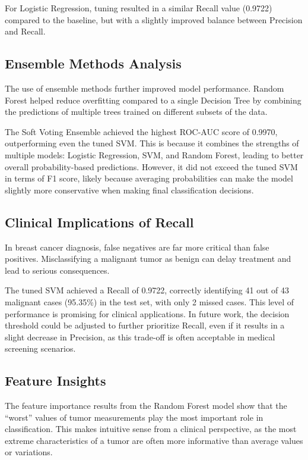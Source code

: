 \documentclass[conference]{IEEEtran}
\begin{document}
For Logistic Regression, tuning resulted in a similar Recall value (0.9722) compared to the baseline, but with a slightly improved balance between Precision and Recall.

\subsection{Ensemble Methods Analysis}

The use of ensemble methods further improved model performance. Random Forest helped reduce overfitting compared to a single Decision Tree by combining the predictions of multiple trees trained on different subsets of the data.

The Soft Voting Ensemble achieved the highest ROC-AUC score of 0.9970, outperforming even the tuned SVM. This is because it combines the strengths of multiple models: Logistic Regression, SVM, and Random Forest, leading to better overall probability-based predictions. However, it did not exceed the tuned SVM in terms of F1 score, likely because averaging probabilities can make the model slightly more conservative when making final classification decisions.

\subsection{Clinical Implications of Recall}

In breast cancer diagnosis, false negatives are far more critical than false positives. Misclassifying a malignant tumor as benign can delay treatment and lead to serious consequences.

The tuned SVM achieved a Recall of 0.9722, correctly identifying 41 out of 43 malignant cases (95.35\%) in the test set, with only 2 missed cases. This level of performance is promising for clinical applications. In future work, the decision threshold could be adjusted to further prioritize Recall, even if it results in a slight decrease in Precision, as this trade-off is often acceptable in medical screening scenarios.

\subsection{Feature Insights}

The feature importance results from the Random Forest model show that the “worst” values of tumor measurements play the most important role in classification. This makes intuitive sense from a clinical perspective, as the most extreme characteristics of a tumor are often more informative than average values or variations.
\end{document}
